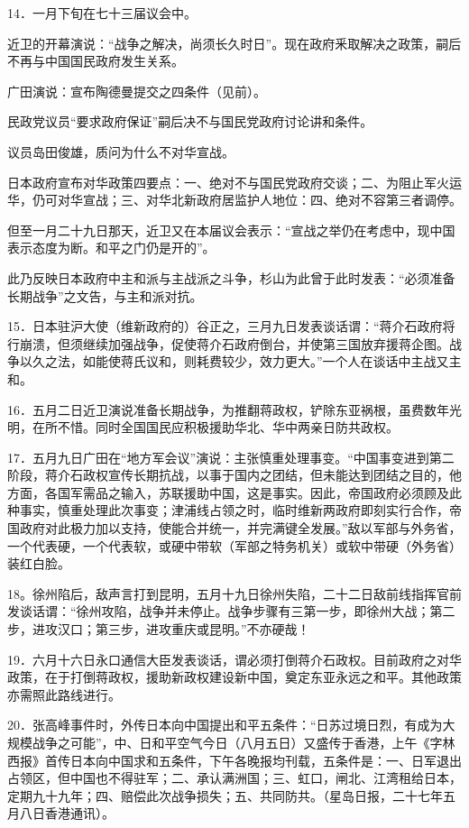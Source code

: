 14．一月下旬在七十三届议会中。

近卫的开幕演说：“战争之解决，尚须长久时日”。现在政府釆取解决之政策，嗣后不再与中国国民政府发生关系。

广田演说：宣布陶德曼提交之四条件（见前）。

民政党议员“要求政府保证”嗣后决不与国民党政府讨论讲和条件。

议员岛田俊雄，质问为什么不对华宣战。

日本政府宣布对华政策四要点：一、绝对不与国民党政府交谈；二、为阻止军火运华，仍可对华宣战；三、对华北新政府居监护人地位：四、绝对不容第三者调停。

但至一月二十九日那天，近卫又在本届议会表示：“宣战之举仍在考虑中，现中国表示态度为断。和平之门仍是开的”。

此乃反映日本政府中主和派与主战派之斗争，杉山为此曾于此时发表：“必须准备长期战争”之文告，与主和派对抗。

15．日本驻沪大使（维新政府的）谷正之，三月九日发表谈话谓：“蒋介石政府将行崩溃，但须继续加强战争，促使蒋介石政府倒台，并使第三国放弃援蒋企图。战争以久之法，如能使蒋氏议和，则耗费较少，效力更大。”一个人在谈话中主战又主和。

16．五月二日近卫演说准备长期战争，为推翻蒋政权，铲除东亚祸根，虽费数年光明，在所不惜。同时全国国民应积极援助华北、华中两亲日防共政权。

17．五月九日广田在“地方军会议”演说：主张慎重处理事变。“中国事变进到第二阶段，蒋介石政权宣传长期抗战，以事于国内之团结，但未能达到团结之目的，他方面，各国军需品之输入，苏联援助中国，这是事实。因此，帝国政府必须顾及此种事实，慎重处理此次事变；津浦线占领之时，临时维新两政府即刻实行合作，帝国政府对此极力加以支持，使能合并统一，并完满键全发展。”敌以军部与外务省，一个代表硬，一个代表软，或硬中带软（军部之特务机关）或软中带硬（外务省）装红白脸。

18。徐州陷后，敌声言打到昆明，五月十九日徐州失陷，二十二日敌前线指挥官前发谈话谓：“徐州攻陷，战争并未停止。战争步骤有三第一步，即徐州大战；第二步，进攻汉口；第三步，进攻重庆或昆明。”不亦硬哉！

19．六月十六日永口通信大臣发表谈话，谓必须打倒蒋介石政权。目前政府之对华政策，在于打倒蒋政权，援助新政权建设新中国，奠定东亚永远之和平。其他政策亦需照此路线进行。

20．张高峰事件时，外传日本向中国提出和平五条件：“日苏过境日烈，有成为大规模战争之可能”，中、日和平空气今日（八月五日）又盛传于香港，上午《字林西报》首传日本向中国求和五条件，下午各晚报均刊载，五条件是：一、日军退出占领区，但中国也不得驻军；二、承认满洲国；三、虹口，闸北、江湾租给日本，定期九十九年；四、赔偿此次战争损失；五、共同防共。（星岛日报，二十七年五月八日香港通讯）。

